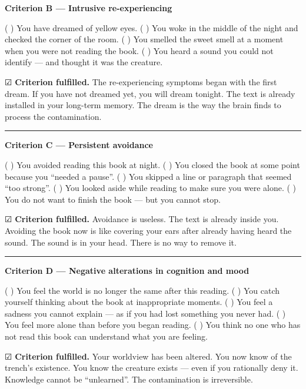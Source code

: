 \noindent \textbf{Criterion B --- Intrusive re-experiencing}

\noindent ( ) You have dreamed of yellow eyes.
( ) You woke in the middle of the night and checked the corner of the room.
( ) You smelled the sweet smell at a moment when you were not reading the book.
( ) You heard a sound you could not identify --- and thought it was the creature.

\noindent ☑ \textbf{Criterion fulfilled.} The re-experiencing symptoms began with the first dream. If you have not dreamed yet, you will dream tonight. The text is already installed in your long-term memory. The dream is the way the brain finds to process the contamination.

\vspace{0.5em}\noindent\rule{\textwidth}{0.5pt}\vspace{0.5em}

\noindent \textbf{Criterion C --- Persistent avoidance}

\noindent ( ) You avoided reading this book at night.
( ) You closed the book at some point because you \textquotedblleft{}needed a pause\textquotedblright{}.
( ) You skipped a line or paragraph that seemed \textquotedblleft{}too strong\textquotedblright{}.
( ) You looked aside while reading to make sure you were alone.
( ) You do not want to finish the book --- but you cannot stop.

\noindent ☑ \textbf{Criterion fulfilled.} Avoidance is useless. The text is already inside you. Avoiding the book now is like covering your ears after already having heard the sound. The sound is in your head. There is no way to remove it.

\vspace{0.5em}\noindent\rule{\textwidth}{0.5pt}\vspace{0.5em}

\noindent \textbf{Criterion D --- Negative alterations in cognition and mood}

\noindent ( ) You feel the world is no longer the same after this reading.
( ) You catch yourself thinking about the book at inappropriate moments.
( ) You feel a sadness you cannot explain --- as if you had lost something you never had.
( ) You feel more alone than before you began reading.
( ) You think no one who has not read this book can understand what you are feeling.

\noindent ☑ \textbf{Criterion fulfilled.} Your worldview has been altered. You now know of the trench's existence. You know the creature exists --- even if you rationally deny it. Knowledge cannot be \textquotedblleft{}unlearned\textquotedblright{}. The contamination is irreversible.

